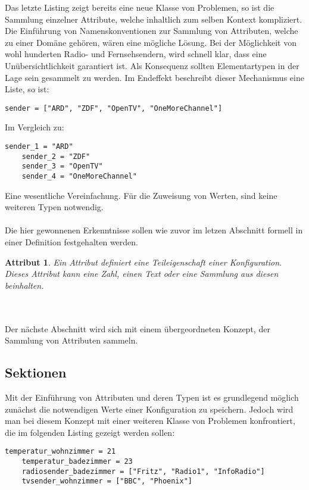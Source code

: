 Das letzte Listing zeigt bereits eine neue Klasse von Problemen, so ist die Sammlung einzelner Attribute, welche inhaltlich zum selben Kontext kompliziert. Die Einführung von Namenskonventionen zur Sammlung von Attributen, welche zu einer Domäne gehören, wären eine mögliche Lösung. Bei der Möglichkeit von wohl hunderten Radio- und Fernsehsendern, wird schnell klar, dass eine Unübersichtlichkeit garantiert ist. Als Konsequenz sollten Elementartypen in der Lage sein gesammelt zu werden. Im Endeffekt beschreibt dieser Mechanismus eine Liste, so ist:

\lstset{language=bash}
\begin{lstlisting}[caption=Sammlung mehrerer Attribute in einer Liste, captionpos=b]
   sender = ["ARD", "ZDF", "OpenTV", "OneMoreChannel"]
\end{lstlisting}

Im Vergleich zu: 

\lstset{language=bash}
\begin{lstlisting}[caption=Sammlung mehrerer Werte ohne Liste, captionpos=b]
  sender_1 = "ARD"
	sender_2 = "ZDF"
	sender_3 = "OpenTV"
	sender_4 = "OneMoreChannel"
\end{lstlisting}


Eine wesentliche Vereinfachung. Für die Zuweisung von Werten, sind keine weiteren Typen notwendig. 
\\\\
Die hier gewonnenen Erkenntnisse sollen wie zuvor im letzen Abschnitt formell in einer Definition festgehalten werden.

\newtheorem{mydef}{Attribut}
\begin{mydef}
Ein Attribut definiert eine Teileigenschaft einer Konfiguration. Dieses Attribut kann eine Zahl, einen Text oder eine Sammlung aus diesen beinhalten.
\end{mydef}
\\\\
Der nächste Abschnitt wird sich mit einem übergeordneten Konzept, der Sammlung von Attributen sammeln.


\subsection{Sektionen}
Mit der Einführung von Attributen und deren Typen ist es grundlegend möglich zunächst die notwendigen Werte einer Konfiguration zu speichern. Jedoch wird man bei diesem Konzept mit einer weiteren Klasse von Problemen konfrontiert, die im folgenden Listing gezeigt werden sollen:
\lstset{language=bash}
\begin{lstlisting}[caption=Attributssammlung ohne Sektionen, captionpos=b]
  	temperatur_wohnzimmer = 21
	temperatur_badezimmer = 23
	radiosender_badezimmer = ["Fritz", "Radio1", "InfoRadio"]
	tvsender_wohnzimmer = ["BBC", "Phoenix"]
\end{lstlisting}

